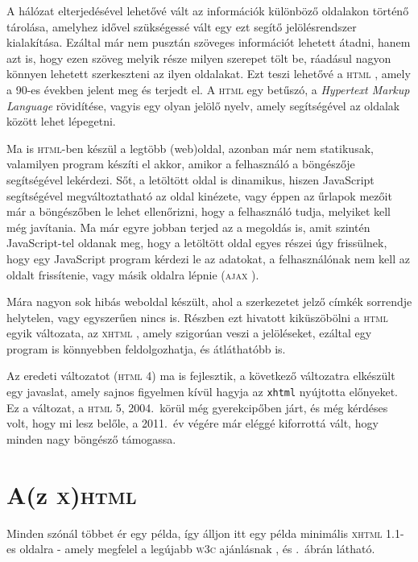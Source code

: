 

%
\label{cha:html}

A hálózat elterjedésével lehetővé vált az információk különböző oldalakon
történő tárolása, amelyhez idővel szükségessé vált egy ezt segítő
jelölésrendszer kialakítása. Ezáltal már nem pusztán szöveges információt
lehetett átadni, hanem azt is, hogy ezen szöveg melyik része milyen szerepet
tölt be, ráadásul nagyon könnyen lehetett szerkeszteni az ilyen oldalakat. Ezt
teszi lehetővé a \textsc{html} \cite{html}, amely a 90-es években jelent meg és
terjedt el. A \textsc{html} egy betűszó, a \emph{Hypertext Markup Language}
rövidítése, vagyis egy olyan jelölő nyelv, amely segítségével az oldalak között
lehet lépegetni.

Ma is \textsc{html}-ben készül a legtöbb (web)oldal, azonban már nem statikusak,
valamilyen program készíti el akkor, amikor a felhasználó a böngészője
segítségével lekérdezi. Sőt, a letöltött oldal is dinamikus, hiszen JavaScript
segítségével megváltoztatható az oldal kinézete, vagy éppen az űrlapok mezőit
már a böngészőben le lehet ellenőrizni, hogy a felhasználó tudja, melyiket kell
még javítania. Ma már egyre jobban terjed az a megoldás is, amit szintén
JavaScript-tel oldanak meg, hogy a letöltött oldal egyes részei úgy frissülnek,
hogy egy JavaScript program kérdezi le az adatokat, a felhasználónak nem kell az
oldalt frissítenie, vagy másik oldalra lépnie (\textsc{ajax} \cite{ajax}).

Mára nagyon sok hibás weboldal készült, ahol a szerkezetet jelző címkék
sorrendje helytelen, vagy egyszerűen nincs is. Részben ezt hivatott kiküszöbölni
a \textsc{html} egyik változata, az \textsc{xhtml} \cite{xhtml1,xhtml11}, amely
szigorúan veszi a jelöléseket, ezáltal egy program is könnyebben feldolgozhatja,
és átláthatóbb is.

Az eredeti változatot (\textsc{html 4}) ma is fejlesztik, a következő változatra
elkészült egy javaslat, amely sajnos figyelmen kívül hagyja az \texttt{xhtml}
nyújtotta előnyeket. Ez a változat, a \textsc{html} 5, 2004.\ körül még
gyerekcipőben járt, és még kérdéses volt, hogy mi lesz belőle, a 2011.\ év
végére már eléggé kiforrottá vált, hogy minden nagy böngésző támogassa.

\section{A(z \textsc{x})\textsc{html}}

Minden szónál többet ér egy példa, így álljon itt egy példa minimális
\textsc{xhtml} 1.1-es oldalra - amely megfelel a legújabb \textsc{w3c}
ajánlásnak \cite{html}, és .\ ábrán látható.

